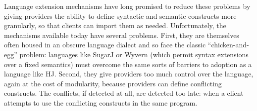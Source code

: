 \documentclass[9pt]{sigplanconf}
\begin{document}
Language extension mechanisms have long promised to reduce these problems by  giving providers the ability to define syntactic and semantic constructs more granularly, so that clients can import them as needed. %
Unfortunately, the mechanisms available today have several problems. First, they are themselves often housed in an obscure language dialect and so face the classic ``chicken-and-egg'' problem: languages like SugarJ \cite{erdweg2011sugarj} or Wyvern \cite{TSLs} (which permit syntax extensions over a fixed semantics) must overcome the same sorts of  barriers to adoption as a language like HJ. Second, they give providers too much control over the language, again at the cost of modularity, because providers can define conflicting constructs. The conflicts, if detected at all, are detected too late: when a client attempts to use the conflicting constructs in the same program. %
\end{document}
